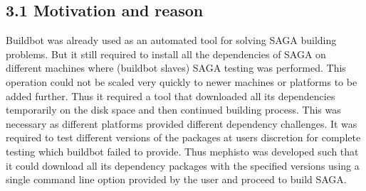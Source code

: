 \documentclass[a4paper,10pt]{article}
\begin{document}
\begin{multicols}{2}
\subsection*{\normalsize 3.1 Motivation and reason}
Buildbot was already used as an automated tool for solving SAGA building problems. But it still required to install all the dependencies of SAGA 
on different machines where (buildbot slaves) SAGA testing was performed. This operation could not be scaled very quickly to 
newer machines or platforms to be added further. Thus it required a tool that downloaded all its dependencies temporarily on the disk space and then
continued building process. This was necessary as different platforms provided different dependency challenges. It was required to test 
different versions of the packages at users discretion for complete testing which buildbot failed to provide. Thus mephisto
was developed such that it could download all its dependency packages with the specified versions using a single command line option
provided by the user and proceed to build SAGA. 

\end{multicols}
\end{document}
